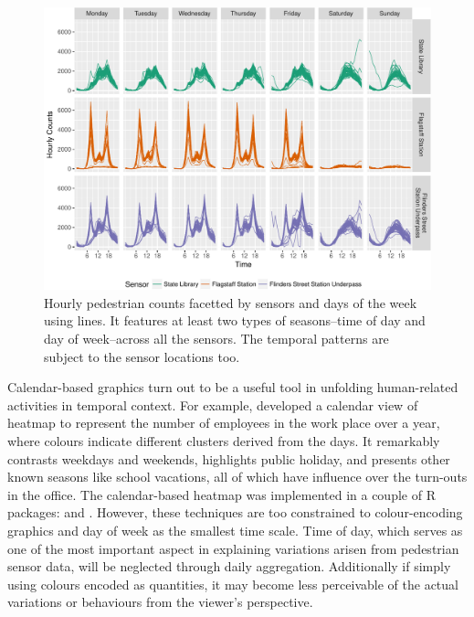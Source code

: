 \documentclass[article]{jss}
\begin{document}
\begin{CodeChunk}
\begin{figure}

{\centering \includegraphics[width=\textwidth]{figure/facet-time-1} 

}

\caption[Hourly pedestrian counts facetted by sensors and days of the week using lines]{Hourly pedestrian counts facetted by sensors and days of the week using lines. It features at least two types of seasons--time of day and day of week--across all the sensors. The temporal patterns are subject to the sensor locations too.}\label{fig:facet-time}
\end{figure}
\end{CodeChunk}

Calendar-based graphics turn out to be a useful tool in unfolding
human-related activities in temporal context. For example,
\citet{VanWijkCluster1999} developed a calendar view of heatmap to
represent the number of employees in the work place over a year, where
colours indicate different clusters derived from the days. It remarkably
contrasts weekdays and weekends, highlights public holiday, and presents
other known seasons like school vacations, all of which have influence
over the turn-outs in the office. The calendar-based heatmap was
implemented in a couple of R packages: 
\citep{R-ggTimeSeries} and  \citep{R-ggcal}. However, these
techniques are too constrained to colour-encoding graphics and day of
week as the smallest time scale. Time of day, which serves as one of the
most important aspect in explaining variations arisen from pedestrian
sensor data, will be neglected through daily aggregation. Additionally
if simply using colours encoded as quantities, it may become less
perceivable of the actual variations or behaviours from the viewer's
perspective.
\end{document}
